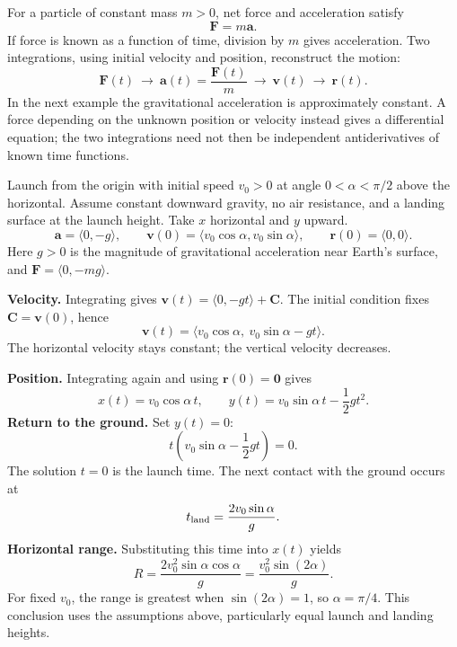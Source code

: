 \documentclass[11pt,letterpaper]{article}
\newcommand{\R}{\mathbf r}
\newcommand{\V}{\mathbf v}
\newcommand{\A}{\mathbf a}
\newcommand{\F}{\mathbf F}
\newcommand{\jj}{\mathbf j}
\newcommand{\heading}[1]{\vspace{5pt}{\large\bfseries #1}\par}
\newcommand{\subhead}[1]{\textbf{#1}\quad}
\begin{document}
\heading{Newton's second law}
For a particle of constant mass $m>0$, net force and acceleration satisfy
\[
 \boxed{\F=m\A.}
\]
If force is known as a function of time, division by $m$ gives acceleration. Two integrations, using initial velocity and position, reconstruct the motion:
\[
 \F(t)\ \longrightarrow\ \A(t)=\frac{\F(t)}m
 \ \longrightarrow\ \V(t)\ \longrightarrow\ \R(t).
\]
In the next example the gravitational acceleration is approximately constant. A force depending on the unknown position or velocity instead gives a differential equation; the two integrations need not then be independent antiderivatives of known time functions.

\newpage
\heading{Projectile motion under constant gravity}
Launch from the origin with initial speed $v_0>0$ at angle $0<\alpha<\pi/2$ above the horizontal. Assume constant downward gravity, no air resistance, and a landing surface at the launch height. Take $x$ horizontal and $y$ upward.
\[
 \A=\langle0,-g\rangle,\qquad
 \V(0)=\langle v_0\cos\alpha,v_0\sin\alpha\rangle,
 \qquad \R(0)=\langle0,0\rangle.
\]
Here $g>0$ is the magnitude of gravitational acceleration near Earth's surface, and $\F=\langle0,-mg\rangle$.

\begin{center}
\end{center}
\subhead{Velocity.} Integrating gives $\V(t)=\langle0,-gt\rangle+\mathbf C$. The initial condition fixes $\mathbf C=\V(0)$, hence
\[
 \V(t)=\langle v_0\cos\alpha,\ v_0\sin\alpha-gt\rangle.
\]
The horizontal velocity stays constant; the vertical velocity decreases.

\subhead{Position.} Integrating again and using $\R(0)=\mathbf0$ gives
\[
 \boxed{x(t)=v_0\cos\alpha\,t,\qquad
        y(t)=v_0\sin\alpha\,t-\frac12gt^2.}
\]
\subhead{Return to the ground.} Set $y(t)=0$:
\[
 t\left(v_0\sin\alpha-\frac12gt\right)=0.
\]
The solution $t=0$ is the launch time. The next contact with the ground occurs at
\[
 t_{\rm land}=\frac{2v_0\sin\alpha}{g}.
\]
\subhead{Horizontal range.} Substituting this time into $x(t)$ yields
\[
 \boxed{R=\frac{2v_0^2\sin\alpha\cos\alpha}{g}
           =\frac{v_0^2\sin(2\alpha)}g.}
\]
For fixed $v_0$, the range is greatest when $\sin(2\alpha)=1$, so $\alpha=\pi/4$. This conclusion uses the assumptions above, particularly equal launch and landing heights.
\end{document}

